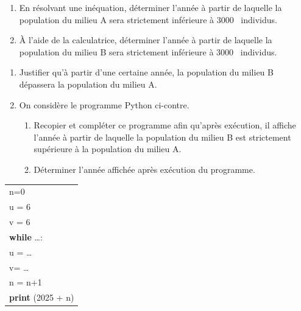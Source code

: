 \documentclass[10pt]{article}
\providecommand{\np}[2][]{{#2~#1}}
\begin{document}
\begin{enumerate}
\item En résolvant une inéquation, déterminer l'année à partir de laquelle la population du milieu A sera strictement inférieure à \np{3000} individus.
\item À l'aide de la calculatrice, déterminer l'année à partir de laquelle la population du milieu B sera strictement inférieure à \np{3000} individus.
\end{enumerate}
\begin{minipage}{0.78\linewidth}
\begin{enumerate}[resume]
\item Justifier qu'à partir d'une certaine année, la population du milieu B dépassera la population du milieu A.
\item On considère le programme Python ci-contre.
	\begin{enumerate}
		\item Recopier et compléter ce programme afin qu'après exécution, il affiche l'année à partir de laquelle la population du milieu B est strictement supérieure à la population du milieu A.
		\item Déterminer l'année affichée après exécution du programme.
	\end{enumerate}
\end{enumerate}
\end{minipage}\hfill
\begin{minipage}{0.19\linewidth}
\begin{tabular}{|l|}\hline
n=0 \\
u = 6\\
v = 6 \\
\textbf{while} \ldots :\\
\qquad u = \ldots\\
\qquad v= \ldots\\
\qquad n = n+1\\
\textbf{print} (2025 + n)\\ \hline
\end{tabular}
\end{minipage}
\end{document}
